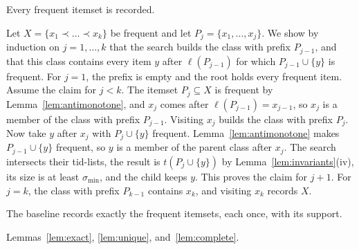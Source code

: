 \begin{lemma}[Completeness]
\label{lem:complete}
Every frequent itemset is recorded.
\end{lemma}
\begin{IEEEproof}
Let $X = \{x_1 \prec \dots \prec x_k\}$ be frequent and let $P_j = \{x_1, \dots, x_j\}$. We
show by induction on $j = 1, \dots, k$ that the search builds the class with prefix
$P_{j-1}$, and that this class contains every item $y$ after $\ell(P_{j-1})$ for which
$P_{j-1} \cup \{y\}$ is frequent. For $j = 1$, the prefix is empty and the root holds
every frequent item. Assume the claim for $j < k$. The itemset $P_j \subseteq X$ is
frequent by Lemma~\ref{lem:antimonotone}, and $x_j$ comes after $\ell(P_{j-1}) =
x_{j-1}$, so $x_j$ is a member of the class with prefix $P_{j-1}$. Visiting $x_j$ builds
the class with prefix $P_j$. Now take $y$ after $x_j$ with $P_j \cup \{y\}$ frequent.
Lemma~\ref{lem:antimonotone} makes $P_{j-1} \cup \{y\}$ frequent, so $y$ is a member of
the parent class after $x_j$. The search intersects their tid-lists, the result is
$t(P_j \cup \{y\})$ by Lemma~\ref{lem:invariants}(iv), its size is at least
$\sigma_{\min}$, and the child keeps $y$. This proves the claim for $j + 1$. For
$j = k$, the class with prefix $P_{k-1}$ contains $x_k$, and visiting $x_k$ records $X$.
\end{IEEEproof}

\begin{theorem}
\label{thm:baseline}
The baseline records exactly the frequent itemsets, each once, with its support.
\end{theorem}
\begin{IEEEproof}
Lemmas~\ref{lem:exact}, \ref{lem:unique}, and~\ref{lem:complete}.
\end{IEEEproof}

